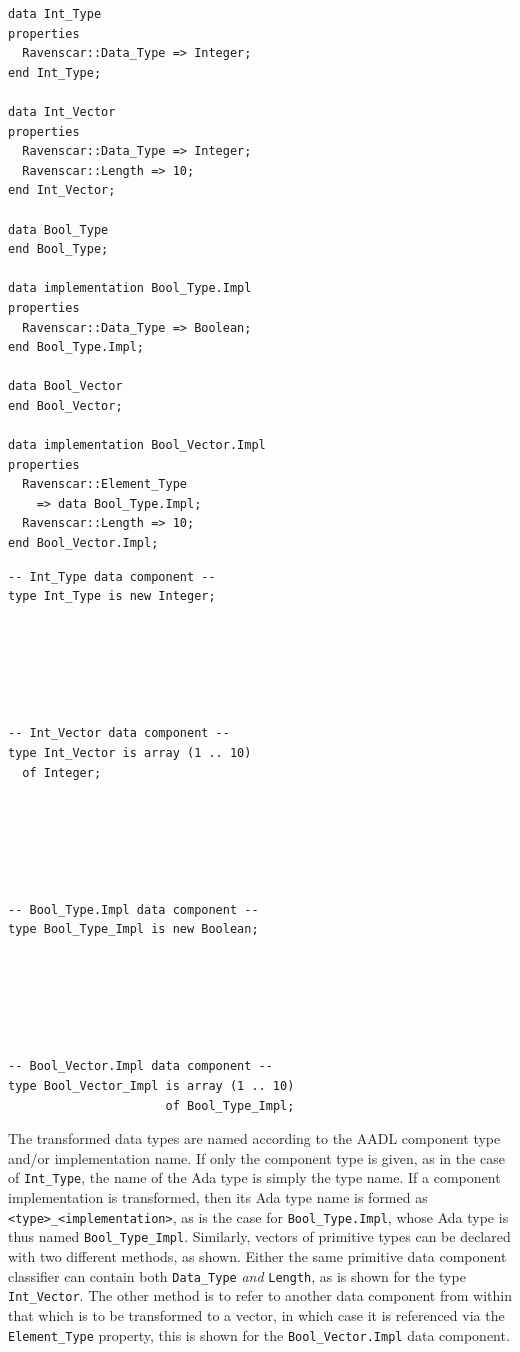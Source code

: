 \begin{minipage}{0.45\linewidth}
\lstset{language=aadl}
\begin{lstlisting}[label=lst:primitive_type_aadl, caption=Primitive
    types in AADL]
data Int_Type
properties
  Ravenscar::Data_Type => Integer;
end Int_Type;

data Int_Vector
properties
  Ravenscar::Data_Type => Integer;
  Ravenscar::Length => 10;
end Int_Vector;

data Bool_Type
end Bool_Type;

data implementation Bool_Type.Impl
properties
  Ravenscar::Data_Type => Boolean;
end Bool_Type.Impl;

data Bool_Vector
end Bool_Vector;

data implementation Bool_Vector.Impl
properties
  Ravenscar::Element_Type 
    => data Bool_Type.Impl;
  Ravenscar::Length => 10;
end Bool_Vector.Impl;
\end{lstlisting}
\end{minipage}
\hspace{5mm}
\begin{minipage}{0.45\linewidth}
\lstset{language=ada}
\begin{lstlisting}[label=lst:primitive_type_ada, caption=The
    transformed types in Ada]
-- Int_Type data component --
type Int_Type is new Integer;






-- Int_Vector data component --
type Int_Vector is array (1 .. 10)
  of Integer;






-- Bool_Type.Impl data component --
type Bool_Type_Impl is new Boolean;






-- Bool_Vector.Impl data component --
type Bool_Vector_Impl is array (1 .. 10) 
                      of Bool_Type_Impl;
\end{lstlisting}
\end{minipage}

The transformed data types are named according to the AADL component
type and/or implementation name. If only the component type is given,
as in the case of \texttt{Int\_Type}, the name of the Ada type is
simply the type name. If a component implementation is transformed,
then its Ada type name is formed as \texttt{<type>\_<implementation>},
as is the case for \texttt{Bool\_Type.Impl}, whose Ada type is thus
named \texttt{Bool\_Type\_Impl}. Similarly, vectors of primitive types
can be declared with two different methods, as shown. Either the same
primitive data component classifier can contain both
\texttt{Data\_Type} \emph{and} \texttt{Length}, as is shown for the
type \texttt{Int\_Vector}. The other method is to refer to another
data component from within that which is to be transformed to a
vector, in which case it is referenced via the \texttt{Element\_Type}
property, this is shown for the \texttt{Bool\_Vector.Impl} data
component.

